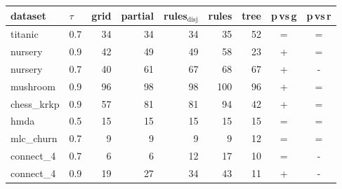 \begin{tabular}{llrrrrrcc}
\toprule
dataset & $\tau$ & grid & partial & rules$_{\mathrm{disj}}$ & rules & tree & p$\,$vs$\,$g & p$\,$vs$\,$r\\
\midrule
titanic & 0.7 & 34 & 34 & 34 & 35 & 52 & = & =\\
nursery & 0.9 & 42 & 49 & 49 & 58 & 23 & + & =\\
nursery & 0.7 & 40 & 61 & 67 & 68 & 67 & + & -\\
mushroom & 0.9 & 96 & 98 & 98 & 100 & 96 & + & =\\
chess\_krkp & 0.9 & 57 & 81 & 81 & 94 & 42 & + & =\\
hmda & 0.5 & 15 & 15 & 15 & 15 & 15 & = & =\\
mlc\_churn & 0.7 & 9 & 9 & 9 & 9 & 12 & = & =\\
connect\_4 & 0.7 & 6 & 6 & 12 & 17 & 10 & = & -\\
connect\_4 & 0.9 & 19 & 27 & 34 & 43 & 11 & + & -\\
\bottomrule
\end{tabular}

